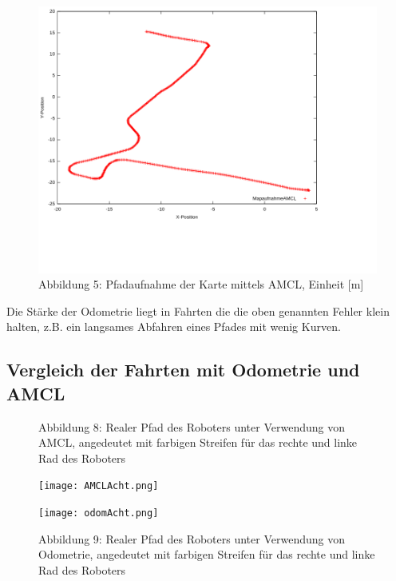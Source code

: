 \documentclass[11pt,a4paper]{article}
\begin{document}
\begin{figure}[H]
    \caption*{Abbildung 5: Pfadaufnahme der Karte mittels AMCL, Einheit [m]}
    \includegraphics[scale = 0.6]{Plots/better ones/mapaufnahmeAMCL.png}
    \centering
\end{figure}
\vspace{-25mm}

Die Stärke der Odometrie liegt in Fahrten die die oben genannten Fehler klein halten, z.B. ein langsames Abfahren eines Pfades mit wenig Kurven.

\subsection*{Vergleich der Fahrten mit Odometrie und AMCL}
\begin{figure}[H]
  \caption*{Abbildung 8: Realer Pfad des Roboters unter Verwendung von AMCL, angedeutet mit farbigen Streifen für das rechte und linke Rad des Roboters}
  \texttt{[image: AMCLAcht.png]}
    \caption*{Abbildung 9: Realer Pfad des Roboters unter Verwendung von Odometrie, angedeutet mit farbigen Streifen für das rechte und linke Rad des Roboters}
    \texttt{[image: odomAcht.png]}
    \centering
  \end{figure}
\end{document}
